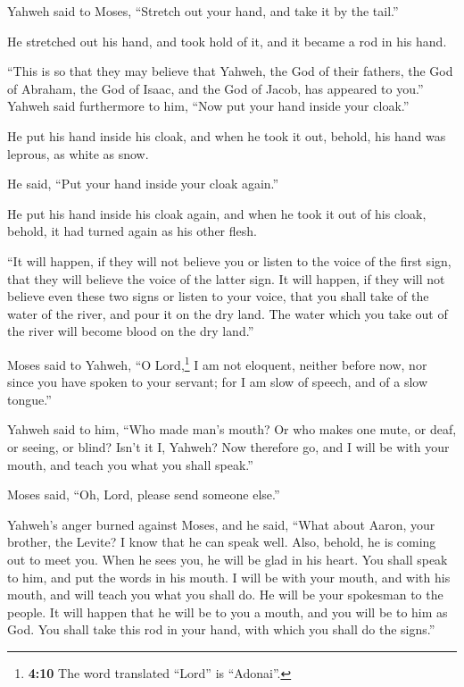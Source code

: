  Yahweh said to Moses, ``Stretch out your hand, and take
it by the tail.''

He stretched out his hand, and took hold of it, and it became a rod in
his hand.

 ``This is so that they may believe that Yahweh, the God
of their fathers, the God of Abraham, the God of Isaac, and the God of
Jacob, has appeared to you.''  Yahweh said furthermore to
him, ``Now put your hand inside your cloak.''

He put his hand inside his cloak, and when he took it out, behold, his
hand was leprous, as white as snow.

 He said, ``Put your hand inside your cloak again.''

He put his hand inside his cloak again, and when he took it out of his
cloak, behold, it had turned again as his other flesh.

 ``It will happen, if they will not believe you or listen
to the voice of the first sign, that they will believe the voice of the
latter sign.  It will happen, if they will not believe
even these two signs or listen to your voice, that you shall take of the
water of the river, and pour it on the dry land. The water which you
take out of the river will become blood on the dry land.''

 Moses said to Yahweh, ``O Lord,\footnote{\textbf{4:10}
  The word translated ``Lord'' is ``Adonai''.} I am not eloquent,
neither before now, nor since you have spoken to your servant; for I am
slow of speech, and of a slow tongue.''

 Yahweh said to him, ``Who made man's mouth? Or who makes
one mute, or deaf, or seeing, or blind? Isn't it I, Yahweh?
 Now therefore go, and I will be with your mouth, and
teach you what you shall speak.''

 Moses said, ``Oh, Lord, please send someone else.''

 Yahweh's anger burned against Moses, and he said, ``What
about Aaron, your brother, the Levite? I know that he can speak well.
Also, behold, he is coming out to meet you. When he sees you, he will be
glad in his heart.  You shall speak to him, and put the
words in his mouth. I will be with your mouth, and with his mouth, and
will teach you what you shall do.  He will be your
spokesman to the people. It will happen that he will be to you a mouth,
and you will be to him as God.  You shall take this rod
in your hand, with which you shall do the signs.''

